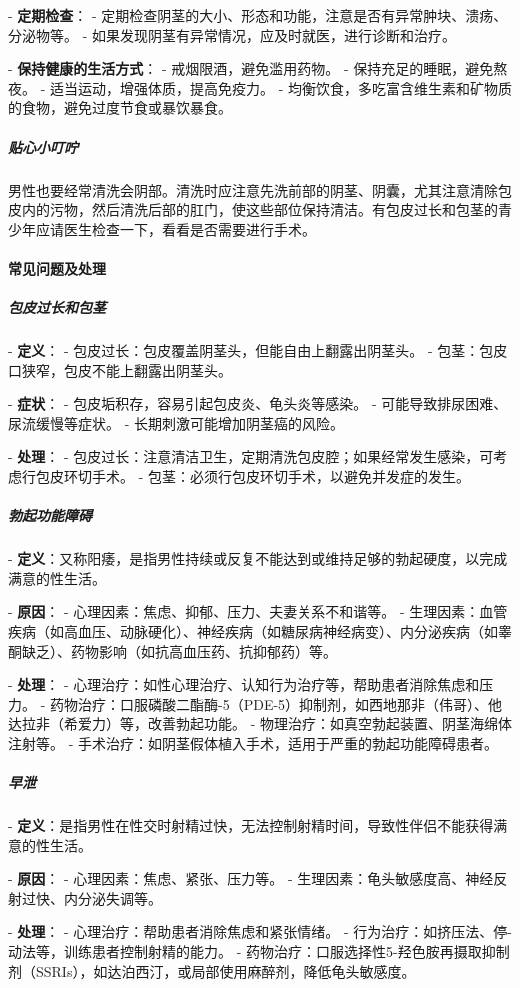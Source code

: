\begin{enumerate}
- \textbf{定期检查}：
  - 定期检查阴茎的大小、形态和功能，注意是否有异常肿块、溃疡、分泌物等。
  - 如果发现阴茎有异常情况，应及时就医，进行诊断和治疗。

- \textbf{保持健康的生活方式}：
  - 戒烟限酒，避免滥用药物。
  - 保持充足的睡眠，避免熬夜。
  - 适当运动，增强体质，提高免疫力。
  - 均衡饮食，多吃富含维生素和矿物质的食物，避免过度节食或暴饮暴食。

\subparagraph{贴心小叮咛}

男性也要经常清洗会阴部。清洗时应注意先洗前部的阴茎、阴囊，尤其注意清除包皮内的污物，然后清洗后部的肛门，使这些部位保持清洁。有包皮过长和包茎的青少年应请医生检查一下，看看是否需要进行手术。

\paragraph{常见问题及处理}

\subparagraph{包皮过长和包茎}
- \textbf{定义}：
  - 包皮过长：包皮覆盖阴茎头，但能自由上翻露出阴茎头。
  - 包茎：包皮口狭窄，包皮不能上翻露出阴茎头。

- \textbf{症状}：
  - 包皮垢积存，容易引起包皮炎、龟头炎等感染。
  - 可能导致排尿困难、尿流缓慢等症状。
  - 长期刺激可能增加阴茎癌的风险。

- \textbf{处理}：
  - 包皮过长：注意清洁卫生，定期清洗包皮腔；如果经常发生感染，可考虑行包皮环切手术。
  - 包茎：必须行包皮环切手术，以避免并发症的发生。

\subparagraph{勃起功能障碍}
- \textbf{定义}：又称阳痿，是指男性持续或反复不能达到或维持足够的勃起硬度，以完成满意的性生活。

- \textbf{原因}：
  - 心理因素：焦虑、抑郁、压力、夫妻关系不和谐等。
  - 生理因素：血管疾病（如高血压、动脉硬化）、神经疾病（如糖尿病神经病变）、内分泌疾病（如睾酮缺乏）、药物影响（如抗高血压药、抗抑郁药）等。

- \textbf{处理}：
  - 心理治疗：如性心理治疗、认知行为治疗等，帮助患者消除焦虑和压力。
  - 药物治疗：口服磷酸二酯酶-5（PDE-5）抑制剂，如西地那非（伟哥）、他达拉非（希爱力）等，改善勃起功能。
  - 物理治疗：如真空勃起装置、阴茎海绵体注射等。
  - 手术治疗：如阴茎假体植入手术，适用于严重的勃起功能障碍患者。

\subparagraph{早泄}
- \textbf{定义}：是指男性在性交时射精过快，无法控制射精时间，导致性伴侣不能获得满意的性生活。

- \textbf{原因}：
  - 心理因素：焦虑、紧张、压力等。
  - 生理因素：龟头敏感度高、神经反射过快、内分泌失调等。

- \textbf{处理}：
  - 心理治疗：帮助患者消除焦虑和紧张情绪。
  - 行为治疗：如挤压法、停-动法等，训练患者控制射精的能力。
  - 药物治疗：口服选择性5-羟色胺再摄取抑制剂（SSRIs），如达泊西汀，或局部使用麻醉剂，降低龟头敏感度。


\end{enumerate}
